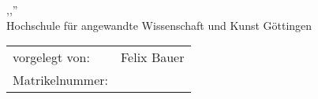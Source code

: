 \thispagestyle{plain}
\begin{titlepage}
	
	\begin{center}
		
		\begin{minipage}{0.5\textwidth}
			\centering
		\end{minipage}%
		\hfill%
		\begin{minipage}{0.5\textwidth}
			\centering
		\end{minipage}\\[6ex]
		
		\huge{\textsc{\textbf{\untertitel}}}\\[1.5ex]
		\LARGE{,,\titel''}\\[4ex]		

		\normalsize
		Hochschule für angewandte Wissenschaft und Kunst Göttingen
			
	
	\vfill
		\normalsize
		\begin{tabular}{w{5.4cm}p{10cm}}
			vorgelegt von:  & \quad Felix Bauer  \\
			Matrikelnummer:	 & \quad \matrikel	\\	 
		\end{tabular}
		\vfill
		
	\end{center}
	
\end{titlepage}
